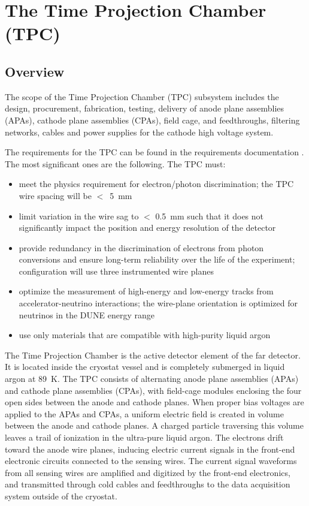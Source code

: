 
\section{The Time Projection Chamber (TPC)} 
\label{sec:detectors-fd-ref-tpc}

\subsection{Overview}

The scope of the Time Projection Chamber (TPC) subsystem includes the design, procurement, fabrication, testing, delivery of  anode plane assemblies (APAs),  cathode plane assemblies (CPAs), field cage, and feedthroughs, filtering networks, cables and power supplies for the cathode high voltage system.

The requirements for the TPC can be found in the requirements documentation \cite{lar-fd-req}. The most significant ones are the following. The TPC must:

\begin{itemize}	
\item meet the physics requirement for electron/photon discrimination;  the TPC wire spacing will be $<$~5~mm
\item limit variation in the wire sag to $<$ 0.5~mm such that it does not significantly impact the position and energy resolution of the detector
\item provide redundancy in the discrimination of electrons from photon conversions and ensure long-term reliability over the life of the experiment;  configuration will use three instrumented wire planes
\item optimize the measurement of high-energy and low-energy tracks from accelerator-neutrino interactions; the wire-plane orientation is optimized for neutrinos in the DUNE energy range
\item use only materials that are compatible with high-purity liquid argon
\end{itemize}

The Time Projection Chamber is the active detector element of the far detector. It is located inside the cryostat 
vessel and is completely submerged in liquid argon at 89~K. The TPC consists of alternating anode plane 
assemblies (APAs) and cathode plane assemblies (CPAs), with field-cage modules enclosing the four open sides between the anode and cathode planes.
When proper bias voltages are applied to the APAs and CPAs, a uniform electric field is created in volume between the anode and cathode planes. A charged particle traversing this volume leaves a trail of 
ionization in the ultra-pure liquid argon.  The electrons drift toward the anode wire planes, inducing electric current signals in the front-end electronic circuits connected to the sensing wires.  The current 
signal waveforms from all sensing wires are amplified and digitized by the front-end electronics, and transmitted through cold cables and feedthroughs to the data acquisition system outside of the cryostat.


